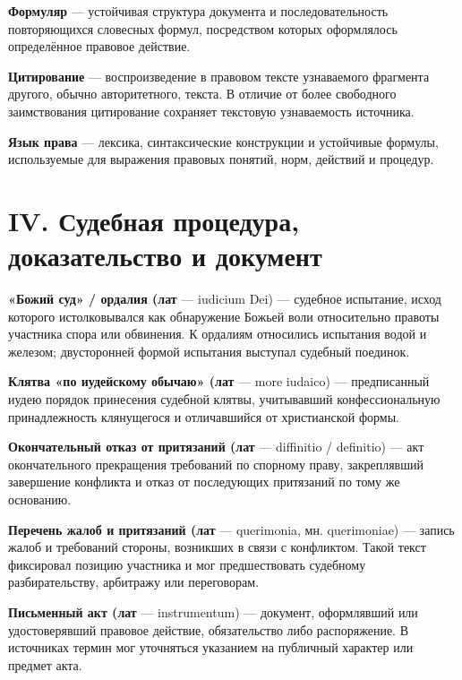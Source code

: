\noindent\textbf{Формуляр} --- устойчивая структура документа и последовательность повторяющихся словесных формул, посредством которых оформлялось определённое правовое действие.
\par\medskip

\noindent\textbf{Цитирование} --- воспроизведение в правовом тексте узнаваемого фрагмента другого, обычно авторитетного, текста. В отличие от более свободного заимствования цитирование сохраняет текстовую узнаваемость источника.
\par\medskip

\noindent\textbf{Язык права} --- лексика, синтаксические конструкции и устойчивые формулы, используемые для выражения правовых понятий, норм, действий и процедур.
\par\medskip

\section{IV. Судебная процедура, доказательство и документ}

\noindent\textbf{«Божий суд» / ордалия (лат} --- iudicium Dei) --- судебное испытание, исход которого истолковывался как обнаружение Божьей воли относительно правоты участника спора или обвинения. К ордалиям относились испытания водой и железом; двусторонней формой испытания выступал судебный поединок.
\par\medskip

\noindent\textbf{Клятва «по иудейскому обычаю» (лат} --- more iudaico) --- предписанный иудею порядок принесения судебной клятвы, учитывавший конфессиональную принадлежность клянущегося и отличавшийся от христианской формы.
\par\medskip

\noindent\textbf{Окончательный отказ от притязаний (лат} --- diffinitio / definitio) --- акт окончательного прекращения требований по спорному праву, закреплявший завершение конфликта и отказ от последующих притязаний по тому же основанию.
\par\medskip

\noindent\textbf{Перечень жалоб и притязаний (лат} --- querimonia, мн. querimoniae) --- запись жалоб и требований стороны, возникших в связи с конфликтом. Такой текст фиксировал позицию участника и мог предшествовать судебному разбирательству, арбитражу или переговорам.
\par\medskip

\noindent\textbf{Письменный акт (лат} --- instrumentum) --- документ, оформлявший или удостоверявший правовое действие, обязательство либо распоряжение. В источниках термин мог уточняться указанием на публичный характер или предмет акта.
\par\medskip


